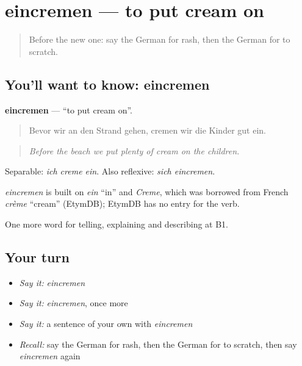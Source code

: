 \section[eincremen]{eincremen — to put cream on}

\label{lesson:GE-C481-eincremen}



\begin{quote}
Before the new one: say the German for rash, then the German for to scratch.
\end{quote}

\subsection*{You'll want to know: eincremen}
\textbf{eincremen} — \textquotedblleft{}to put cream on\textquotedblright{}.

\begin{quote}
Bevor wir an den Strand gehen, cremen wir die Kinder gut ein.
\end{quote}

\begin{quote}
\emph{Before the beach we put plenty of cream on the children.}
\end{quote}

Separable: \emph{ich creme ein}. Also reflexive: \emph{sich eincremen}.

\begin{cousinweb}
\emph{eincremen} is built on \emph{ein} \textquotedblleft{}in\textquotedblright{} and \emph{Creme}, which was borrowed from French \emph{crème} \textquotedblleft{}cream\textquotedblright{} (EtymDB); EtymDB has no entry for the verb.
\end{cousinweb}

\begin{grammarlens}[title={What you've built}]
One more word for telling, explaining and describing at B1.
\end{grammarlens}

\subsection*{Your turn}
\begin{itemize}
\raggedright
  \item \emph{Say it:} \emph{eincremen}
  \item \emph{Say it:} \emph{eincremen}, once more
  \item \emph{Say it:} a sentence of your own with \emph{eincremen}
  \item \emph{Recall:} say the German for rash, then the German for to scratch, then say \emph{eincremen} again
\end{itemize}

